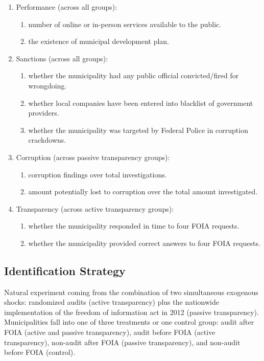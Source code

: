 \documentclass[]{article}
\begin{document}
\begin{enumerate}
\item
  Performance (across all groups):

  \begin{enumerate}
  \item
    number of online or in-person services available to the public.
  \item
    the existence of municipal development plan.
  \end{enumerate}
\item
  Sanctions (across all groups):

  \begin{enumerate}
  \item
    whether the municipality had any public official convicted/fired for
    wrongdoing.
  \item
    whether local companies have been entered into blacklist of
    government providers.
  \item
    whether the municipality was targeted by Federal Police in
    corruption crackdowns.
  \end{enumerate}
\item
  Corruption (across passive transparency groups):

  \begin{enumerate}
  \item
    corruption findings over total investigations.
  \item
    amount potentially lost to corruption over the total amount
    investigated.
  \end{enumerate}
\item
  Transparency (across active transparency groups):

  \begin{enumerate}
  \item
    whether the municipality responded in time to four FOIA requests.
  \item
    whether the municipality provided correct answers to four FOIA
    requests.
  \end{enumerate}
\end{enumerate}

\hypertarget{identification-strategy-2}{%
\subsection{Identification Strategy}\label{identification-strategy-2}}

Natural experiment coming from the combination of two simultaneous
exogenous shocks: randomized audits (active transparency) plus the
nationwide implementation of the freedom of information act in 2012
(passive transparency). Municipalities fall into one of three treatments
or one control group: audit after FOIA (active and passive
transparency), audit before FOIA (active transparency), non-audit after
FOIA (passive transparency), and non-audit before FOIA (control).
\end{document}
